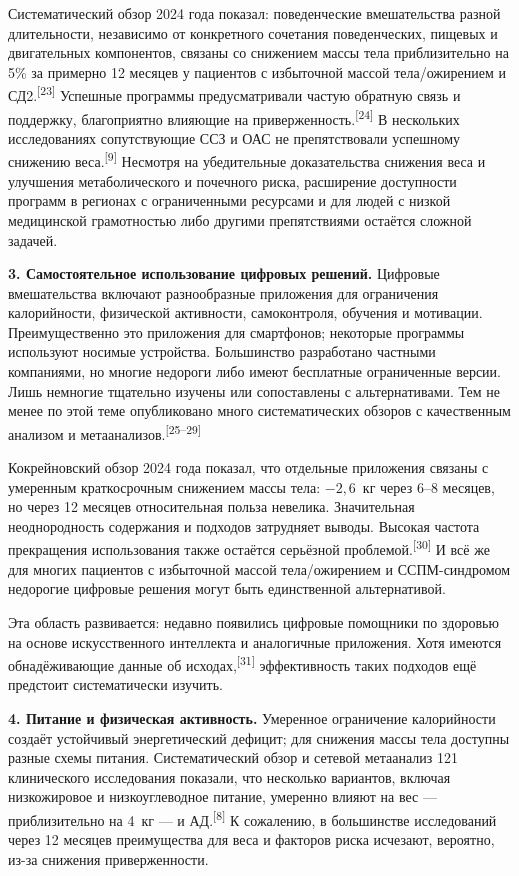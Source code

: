 \documentclass[11pt,a4paper]{article}
\newcommand{\src}[1]{\textsuperscript{[#1]}}
\begin{document}
Систематический обзор 2024 года показал: поведенческие вмешательства разной длительности, независимо от конкретного сочетания поведенческих, пищевых и двигательных компонентов, связаны со снижением массы тела приблизительно на 5\% за примерно 12 месяцев у пациентов с избыточной массой тела/ожирением и СД2.\src{23} Успешные программы предусматривали частую обратную связь и поддержку, благоприятно влияющие на приверженность.\src{24} В нескольких исследованиях сопутствующие ССЗ и ОАС не препятствовали успешному снижению веса.\src{9} Несмотря на убедительные доказательства снижения веса и улучшения метаболического и почечного риска, расширение доступности программ в регионах с ограниченными ресурсами и для людей с низкой медицинской грамотностью либо другими препятствиями остаётся сложной задачей.

\textbf{3. Самостоятельное использование цифровых решений.} Цифровые вмешательства включают разнообразные приложения для ограничения калорийности, физической активности, самоконтроля, обучения и мотивации. Преимущественно это приложения для смартфонов; некоторые программы используют носимые устройства. Большинство разработано частными компаниями, но многие недороги либо имеют бесплатные ограниченные версии. Лишь немногие тщательно изучены или сопоставлены с альтернативами. Тем не менее по этой теме опубликовано много систематических обзоров с качественным анализом и метаанализов.\src{25--29}

Кокрейновский обзор 2024 года показал, что отдельные приложения связаны с умеренным краткосрочным снижением массы тела: $-2{,}6$~кг через 6--8 месяцев, но через 12 месяцев относительная польза невелика. Значительная неоднородность содержания и подходов затрудняет выводы. Высокая частота прекращения использования также остаётся серьёзной проблемой.\src{30} И всё же для многих пациентов с избыточной массой тела/ожирением и ССПМ-синдромом недорогие цифровые решения могут быть единственной альтернативой.

Эта область развивается: недавно появились цифровые помощники по здоровью на основе искусственного интеллекта и аналогичные приложения. Хотя имеются обнадёживающие данные об исходах,\src{31} эффективность таких подходов ещё предстоит систематически изучить.

\textbf{4. Питание и физическая активность.} Умеренное ограничение калорийности создаёт устойчивый энергетический дефицит; для снижения массы тела доступны разные схемы питания. Систематический обзор и сетевой метаанализ 121 клинического исследования показали, что несколько вариантов, включая низкожировое и низкоуглеводное питание, умеренно влияют на вес --- приблизительно на 4~кг --- и АД.\src{8} К сожалению, в большинстве исследований через 12 месяцев преимущества для веса и факторов риска исчезают, вероятно, из-за снижения приверженности.
\end{document}
